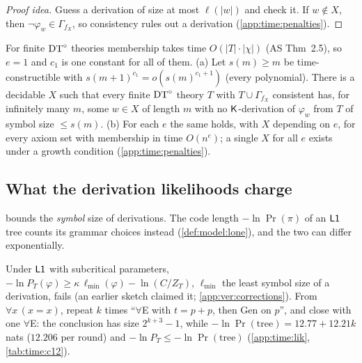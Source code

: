 \begin{proof}[Proof idea]
Guess a derivation of size at most $\ell(|w|)$ and check it. If $w\notin X$, then $\neg\varphi_w\in\Gamma_{f_X}$, so consistency rules out a derivation (\cref{app:time:penalties}).
\end{proof}

\begin{corollary}\label{cor:time:hard}
For finite $\mathrm{DT}^{\circ}$ theories membership takes time $O(|T|\cdot|\chi|)$ (AS Thm~2.5), so $e=1$ and $c_1$ is one constant for all of them.
(a) Let $s(m)\ge m$ be time-constructible with $s(m+1)^{c_1}=o(s(m)^{c_1+1})$ (every polynomial). There is a decidable $X$ such that every finite $\mathrm{DT}^{\circ}$ theory $T$ with $T\cup\Gamma_{f_X}$ consistent has, for infinitely many $m$, some $w\in X$ of length $m$ with no $\mathsf{K}$-derivation of $\varphi_w$ from $T$ of symbol size $\le s(m)$.
(b) For each $e$ the same holds, with $X$ depending on $e$, for every axiom set with membership in time $O(n^e)$; a single $X$ for all $e$ exists under a growth condition  (\cref{app:time:penalties}).
\end{corollary}

\subsection{What the derivation likelihoods charge}\label{sec:time:lik}

 bounds the \emph{symbol} size of derivations. The code length $-\ln\Pr(\pi)$ of an $\mathord{\mathsf{L1}}$ tree counts its grammar choices instead (\cref{def:model:lone}), and the two can differ exponentially.

\begin{remark}\label{prop:time:lonesize}
Under $\mathord{\mathsf{L1}}$ with subcritical parameters, $-\ln P_T(\varphi)\ge\kappa\,\ell_{\min}(\varphi)-\ln(C/Z_T)$, $\ell_{\min}$ the least symbol size of a derivation, fails (an earlier sketch claimed it; \cref{app:ver:corrections}). From $\forall x\,(x=x)$, repeat $k$ times ``$\forall$E with $t=p+p$, then Gen on $p$'', and close with one $\forall$E: the conclusion has size $2^{k+3}-1$, while $-\ln\Pr(\text{tree})=12.77+12.21k$ nats ($12.206$ per round) and $-\ln P_T\le-\ln\Pr(\text{tree})$ (\cref{app:time:lik}, \cref{tab:time:c12}).
\end{remark}


